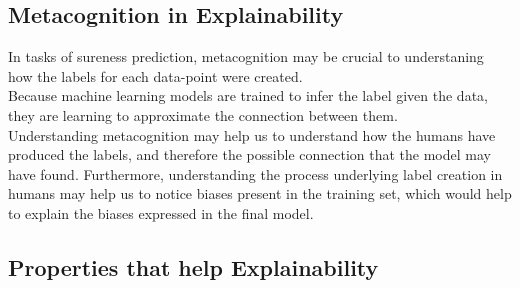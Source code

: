 \documentclass[11pt, oneside]{article}   	%
\begin{document}
\subsection{Metacognition in Explainability}
In tasks of sureness prediction, metacognition may be crucial to understaning how the labels for each data-point were created.\\

Because machine learning models are trained to infer the label given the data, they are learning to approximate the connection between them.\\
Understanding metacognition may help us to understand how the humans have produced the labels, and therefore the possible connection that the model may have found. Furthermore, understanding the process underlying label creation in humans may help us to notice biases present in the training set, which would help to explain the biases expressed in the final model.

\subsection{Properties that help Explainability}
\end{document}
